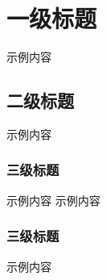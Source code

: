 \chapter{一级标题}
示例内容

\section{二级标题}
示例内容
\subsection{三级标题}
示例内容
示例内容\cite{10.1007/978-3-662-44848-9_34}

\subsection{三级标题}
示例内容


